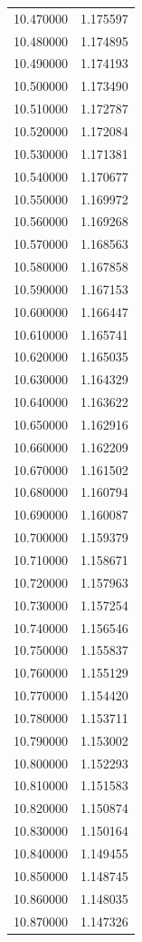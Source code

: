 \begin{tabular}{rr}
10.470000 & 1.175597 \\
10.480000 & 1.174895 \\
10.490000 & 1.174193 \\
10.500000 & 1.173490 \\
10.510000 & 1.172787 \\
10.520000 & 1.172084 \\
10.530000 & 1.171381 \\
10.540000 & 1.170677 \\
10.550000 & 1.169972 \\
10.560000 & 1.169268 \\
10.570000 & 1.168563 \\
10.580000 & 1.167858 \\
10.590000 & 1.167153 \\
10.600000 & 1.166447 \\
10.610000 & 1.165741 \\
10.620000 & 1.165035 \\
10.630000 & 1.164329 \\
10.640000 & 1.163622 \\
10.650000 & 1.162916 \\
10.660000 & 1.162209 \\
10.670000 & 1.161502 \\
10.680000 & 1.160794 \\
10.690000 & 1.160087 \\
10.700000 & 1.159379 \\
10.710000 & 1.158671 \\
10.720000 & 1.157963 \\
10.730000 & 1.157254 \\
10.740000 & 1.156546 \\
10.750000 & 1.155837 \\
10.760000 & 1.155129 \\
10.770000 & 1.154420 \\
10.780000 & 1.153711 \\
10.790000 & 1.153002 \\
10.800000 & 1.152293 \\
10.810000 & 1.151583 \\
10.820000 & 1.150874 \\
10.830000 & 1.150164 \\
10.840000 & 1.149455 \\
10.850000 & 1.148745 \\
10.860000 & 1.148035 \\
10.870000 & 1.147326 \\

\end{tabular}
